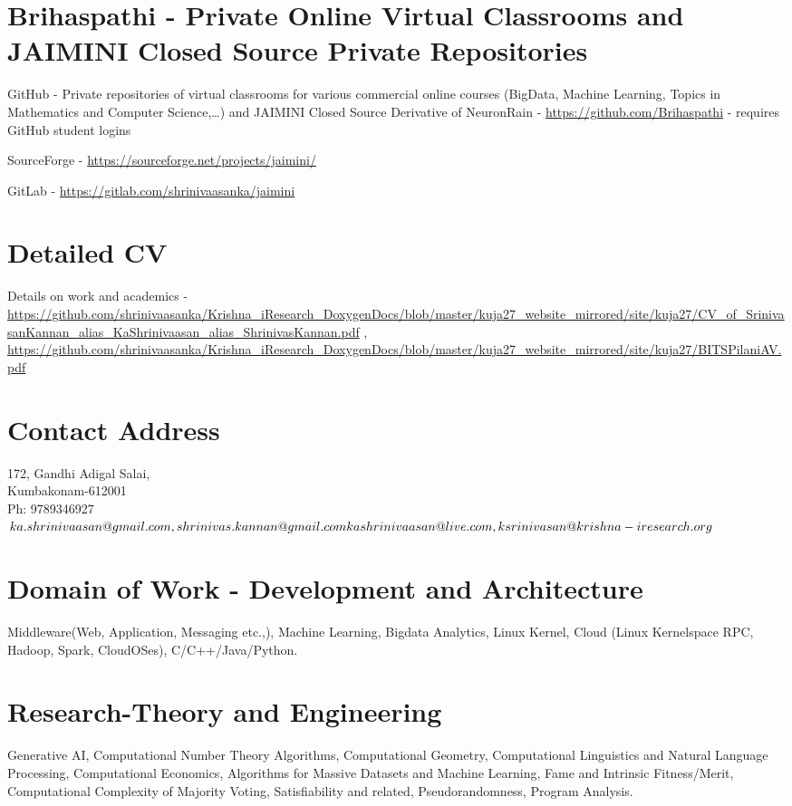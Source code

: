 \documentclass[11pt,onecolumn]{article}
\begin{document}
\section{Brihaspathi - Private Online Virtual Classrooms and JAIMINI Closed Source Private Repositories}

GitHub - Private repositories of virtual classrooms for various commercial online courses (BigData, Machine Learning, Topics in Mathematics and Computer Science,…) and JAIMINI Closed Source Derivative of NeuronRain - \url {https://github.com/Brihaspathi} - requires GitHub student logins

SourceForge - \url {https://sourceforge.net/projects/jaimini/}

GitLab - \url {https://gitlab.com/shrinivaasanka/jaimini}

\section{Detailed CV}
Details on work and academics - \url {https://github.com/shrinivaasanka/Krishna_iResearch_DoxygenDocs/blob/master/kuja27_website_mirrored/site/kuja27/CV\_of\_SrinivasanKannan\_alias\_KaShrinivaasan\_alias\_ShrinivasKannan.pdf} , \url {https://github.com/shrinivaasanka/Krishna_iResearch_DoxygenDocs/blob/master/kuja27_website_mirrored/site/kuja27/BITSPilaniAV.pdf}

\section{Contact Address}
172, Gandhi Adigal Salai, \\
Kumbakonam-612001 \\
Ph: 9789346927 \\
$ka.shrinivaasan@gmail.com, shrinivas.kannan@gmail.com \\ kashrinivaasan@live.com, ksrinivasan@krishna-iresearch.org$ 

\section{Domain of Work - Development and Architecture}
Middleware(Web, Application, Messaging etc.,), Machine Learning, Bigdata Analytics, Linux Kernel, Cloud (Linux Kernelspace RPC, Hadoop, Spark, CloudOSes), C/C++/Java/Python.

\section{Research-Theory and Engineering}
Generative AI, Computational Number Theory Algorithms, Computational Geometry, Computational Linguistics and Natural Language Processing, Computational Economics, Algorithms for Massive Datasets and Machine Learning, Fame and Intrinsic Fitness/Merit, Computational Complexity of Majority Voting, Satisfiability and related, Pseudorandomness, Program Analysis.
\end{document}
